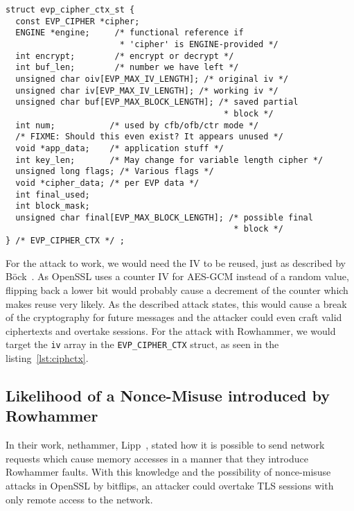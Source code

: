 \begin{minipage}{\linewidth}
\begin{lstlisting}[style=CStyle,
                   caption={Context struct describing the Cipher used in TLS.
This struct is used as the SSL context inside OpenSSL. Source is taken from
OpenSSL version $1.1.0g$},
                   label={lst:ciphctx}]
struct evp_cipher_ctx_st {
  const EVP_CIPHER *cipher;
  ENGINE *engine;     /* functional reference if
                       * 'cipher' is ENGINE-provided */
  int encrypt;        /* encrypt or decrypt */
  int buf_len;        /* number we have left */
  unsigned char oiv[EVP_MAX_IV_LENGTH]; /* original iv */
  unsigned char iv[EVP_MAX_IV_LENGTH]; /* working iv */
  unsigned char buf[EVP_MAX_BLOCK_LENGTH]; /* saved partial
                                            * block */
  int num;           /* used by cfb/ofb/ctr mode */
  /* FIXME: Should this even exist? It appears unused */
  void *app_data;    /* application stuff */
  int key_len;       /* May change for variable length cipher */
  unsigned long flags; /* Various flags */
  void *cipher_data; /* per EVP data */
  int final_used;
  int block_mask;
  unsigned char final[EVP_MAX_BLOCK_LENGTH]; /* possible final
                                              * block */
} /* EVP_CIPHER_CTX */ ;
\end{lstlisting}
\end{minipage}

For the attack to work, we would need the IV to be reused, just as described by
Böck~\etal\cite{gcmnonceattack}. As OpenSSL uses a counter IV for AES-GCM
instead of a random value, flipping back a lower bit would probably cause a
decrement of the counter which makes reuse very likely. As the described attack
states, this would cause a break of the cryptography for future messages and the
attacker could even craft valid ciphertexts and overtake sessions. For the
attack with Rowhammer, we would target the \texttt{iv} array in the
\texttt{EVP\_CIPHER\_CTX} struct, as seen in the listing~\ref{lst:ciphctx}.

\subsection{Likelihood of a Nonce-Misuse introduced by Rowhammer}

In their work, nethammer, Lipp~\etal\cite{nethammer}, stated how it is possible
to send network requests which cause memory accesses in a manner that they
introduce Rowhammer faults. With this knowledge and the possibility of
nonce-misuse attacks in OpenSSL by bitflips, an attacker could overtake TLS
sessions with only remote access to the network.

